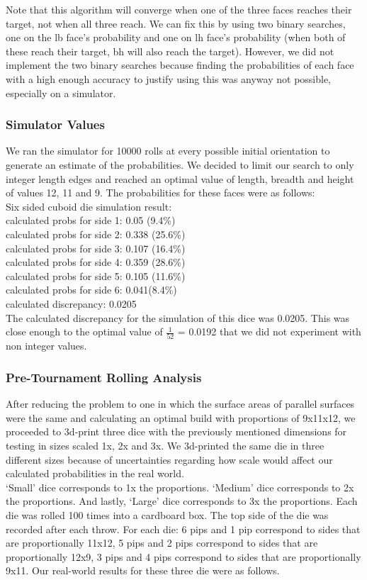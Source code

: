 Note that this algorithm will converge when one of the three faces reaches their target, not when all three reach. We can fix this by using two binary searches, one on the lb face's probability and one on lh face's probability (when both of these reach their target, bh will also reach the target). However, we did not implement the two binary searches because finding the probabilities of each face with a high enough accuracy to justify using this was anyway not possible, especially on a simulator.\\

\subsubsection{Simulator Values}
We ran the simulator for 10000 rolls at every possible initial orientation to generate an estimate of the probabilities. We decided to limit our search to only integer length edges and reached an optimal value of length, breadth and height of values 12, 11 and 9. The probabilities for these faces were as follows:\\
Six sided cuboid die simulation result:\\
calculated probs for side 1: 0.05 (9.4\%)\\
calculated probs for side 2: 0.338 (25.6\%)\\
calculated probs for side 3: 0.107 (16.4\%)\\
calculated probs for side 4: 0.359 (28.6\%)\\
calculated probs for side 5: 0.105 (11.6\%)\\
calculated probs for side 6: 0.041(8.4\%)\\
calculated discrepancy: 0.0205\\
The calculated discrepancy for the simulation of this dice was 0.0205. This was close enough to the optimal value of $\frac{1}{52}$ = 0.0192 that we did not experiment with non integer values.\\

\subsubsection{Pre-Tournament Rolling Analysis}
After reducing the problem to one in which the surface areas of parallel surfaces were the same and calculating an optimal build with proportions of 9x11x12, we proceeded to 3d-print three dice with the previously mentioned dimensions for testing in sizes scaled 1x, 2x and 3x. We 3d-printed the same die in three different sizes because of uncertainties regarding how scale would affect our calculated probabilities in the real world.\\
‘Small’ dice corresponds to 1x the proportions. ‘Medium’ dice corresponds to 2x the proportions. And lastly, ‘Large’ dice corresponds to 3x the proportions. Each die was rolled 100 times into a cardboard box. The top side of the die was recorded after each throw. For each die: 6 pips and 1 pip correspond to sides that are proportionally 11x12, 5 pips and 2 pips correspond to sides that are proportionally 12x9, 3 pips and 4 pips correspond to sides that are proportionally 9x11. Our real-world results for these three die were as follows.\\

